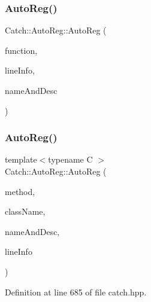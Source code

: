 \subsubsection{\texorpdfstring{Auto\+Reg()}{AutoReg()}\hspace{0.1cm}{\footnotesize\ttfamily [1/2]}}
{\footnotesize\ttfamily Catch\+::\+Auto\+Reg\+::\+Auto\+Reg (\begin{DoxyParamCaption}\item[{\hyperlink{namespace_catch_a26414f52d0835939fae52aadd27e6257}{Test\+Function}}]{function,  }\item[{\hyperlink{struct_catch_1_1_source_line_info}{Source\+Line\+Info} const \&}]{line\+Info,  }\item[{\hyperlink{struct_catch_1_1_name_and_desc}{Name\+And\+Desc} const \&}]{name\+And\+Desc }\end{DoxyParamCaption})}

\hypertarget{struct_catch_1_1_auto_reg_a1bf9207fe0a02b46dc0ab1cc03cbe738}{}\label{struct_catch_1_1_auto_reg_a1bf9207fe0a02b46dc0ab1cc03cbe738} 
\subsubsection{\texorpdfstring{Auto\+Reg()}{AutoReg()}\hspace{0.1cm}{\footnotesize\ttfamily [2/2]}}
{\footnotesize\ttfamily template$<$typename C $>$ \\
Catch\+::\+Auto\+Reg\+::\+Auto\+Reg (\begin{DoxyParamCaption}\item[{void(C\+::$\ast$)()}]{method,  }\item[{char const $\ast$}]{class\+Name,  }\item[{\hyperlink{struct_catch_1_1_name_and_desc}{Name\+And\+Desc} const \&}]{name\+And\+Desc,  }\item[{\hyperlink{struct_catch_1_1_source_line_info}{Source\+Line\+Info} const \&}]{line\+Info }\end{DoxyParamCaption})\hspace{0.3cm}{\ttfamily [inline]}}



Definition at line 685 of file catch.\+hpp.

